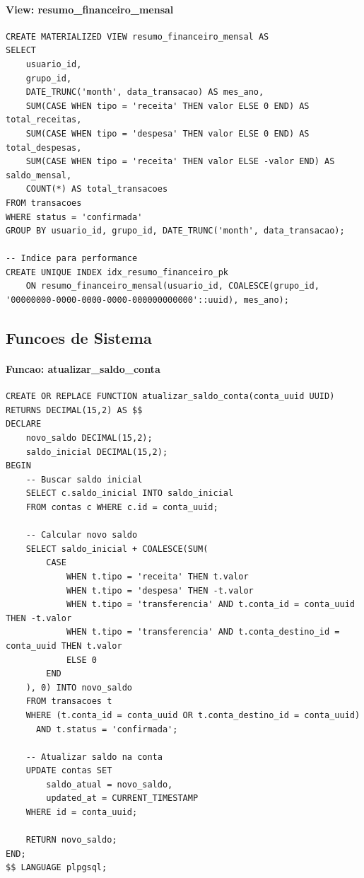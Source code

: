 \paragraph{View: resumo\_financeiro\_mensal}
\begin{lstlisting}[caption=View materializada para resumos mensais]
CREATE MATERIALIZED VIEW resumo_financeiro_mensal AS
SELECT 
    usuario_id,
    grupo_id,
    DATE_TRUNC('month', data_transacao) AS mes_ano,
    SUM(CASE WHEN tipo = 'receita' THEN valor ELSE 0 END) AS total_receitas,
    SUM(CASE WHEN tipo = 'despesa' THEN valor ELSE 0 END) AS total_despesas,
    SUM(CASE WHEN tipo = 'receita' THEN valor ELSE -valor END) AS saldo_mensal,
    COUNT(*) AS total_transacoes
FROM transacoes 
WHERE status = 'confirmada'
GROUP BY usuario_id, grupo_id, DATE_TRUNC('month', data_transacao);

-- Indice para performance
CREATE UNIQUE INDEX idx_resumo_financeiro_pk 
    ON resumo_financeiro_mensal(usuario_id, COALESCE(grupo_id, '00000000-0000-0000-0000-000000000000'::uuid), mes_ano);
\end{lstlisting}

\subsection{Funcoes de Sistema}

\paragraph{Funcao: atualizar\_saldo\_conta}
\begin{lstlisting}[caption=Funcao para atualizar saldo das contas]
CREATE OR REPLACE FUNCTION atualizar_saldo_conta(conta_uuid UUID)
RETURNS DECIMAL(15,2) AS $$
DECLARE
    novo_saldo DECIMAL(15,2);
    saldo_inicial DECIMAL(15,2);
BEGIN
    -- Buscar saldo inicial
    SELECT c.saldo_inicial INTO saldo_inicial 
    FROM contas c WHERE c.id = conta_uuid;
    
    -- Calcular novo saldo
    SELECT saldo_inicial + COALESCE(SUM(
        CASE 
            WHEN t.tipo = 'receita' THEN t.valor
            WHEN t.tipo = 'despesa' THEN -t.valor
            WHEN t.tipo = 'transferencia' AND t.conta_id = conta_uuid THEN -t.valor
            WHEN t.tipo = 'transferencia' AND t.conta_destino_id = conta_uuid THEN t.valor
            ELSE 0
        END
    ), 0) INTO novo_saldo
    FROM transacoes t
    WHERE (t.conta_id = conta_uuid OR t.conta_destino_id = conta_uuid)
      AND t.status = 'confirmada';
    
    -- Atualizar saldo na conta
    UPDATE contas SET 
        saldo_atual = novo_saldo,
        updated_at = CURRENT_TIMESTAMP
    WHERE id = conta_uuid;
    
    RETURN novo_saldo;
END;
$$ LANGUAGE plpgsql;
\end{lstlisting}
